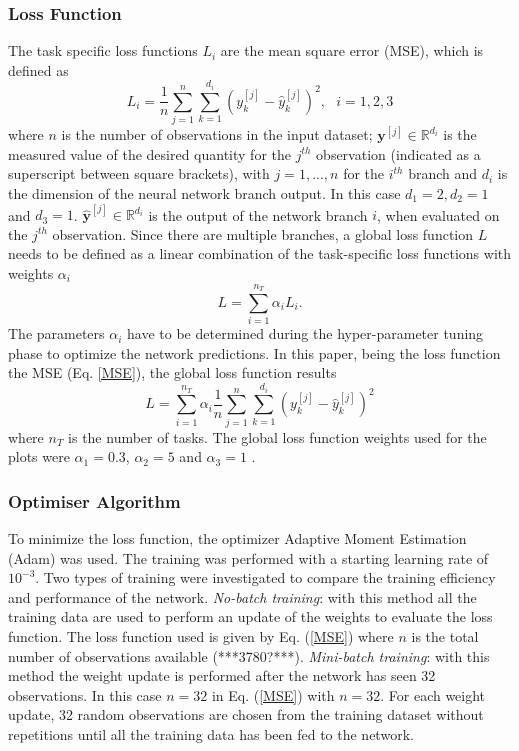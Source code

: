 \documentclass[9pt,twocolumn,twoside,pdftex]{optica}
\begin{document}
\subsubsection{Loss Function}

The task specific loss functions $L_i$ are the mean square error (MSE), which is defined as
\begin{equation}
L_i = \frac{1}{n} \sum_{j=1}^n \sum_{k=1}^{d_i} (y_k^{[j]}-\hat y_k^{[j]})^2, \ \ \ i=1,2,3
\label{MSE}
\end{equation}
where $n$ is the number of observations in the input dataset; ${\mathbold y}^{[j]} \in \mathbb{R}^{d_i}$ is the measured value of the desired quantity for the $j^{th}$ observation (indicated as a superscript between square brackets), with $j=1, ..., n$ for the $i^{th}$ branch and $d_i$ is the dimension of the neural network branch output. In this case $d_1=2, d_2=1$ and $d_3=1$. $ \hat {\mathbold y}^{[j]} \in \mathbb{R}^{d_i}$ is the output of the network branch $i$, when evaluated on the $j^{th}$ observation. Since there are multiple branches, a global loss function $L$ needs to be defined as a linear combination of the task-specific loss functions with weights $\alpha_i$ 
\begin{equation}
L = \sum_{i=1}^{n_T}\alpha_i L_i .
\label{globalcf}
\end{equation}
The parameters $\alpha_i$ have to be determined during the hyper-parameter tuning phase to optimize the network predictions.
In this paper, being the loss function the MSE (Eq. \ref{MSE}), the global loss function results
\begin{equation}
L = \sum_{i=1}^{n_T}\alpha_i \frac{1}{n} \sum_{j=1}^n \sum_{k=1}^{d_i} (y_k^{[j]}-\hat y_k^{[j]})^2
\end{equation}
where  $n_T$ is the number of tasks. The global loss function weights used for the plots were $\alpha_1 = 0.3$, $\alpha_2 = 5$ and $\alpha_3 = 1$ \cite{Michelucci2019_2}.
 

\subsubsection{Optimiser Algorithm}

To minimize the loss function, the optimizer Adaptive Moment Estimation (Adam) \cite{Kingma2014, Michelucci2017} was used. The training was performed with a starting learning rate of $10^{-3}$. Two types of training were investigated to compare the training efficiency and performance of the network. {\sl No-batch training}: with this method all the training data  are used to perform an update of the weights to evaluate the loss function. The loss function used is given by Eq. (\ref{MSE}) where $n$ is the total number of observations available (***3780?***). {\sl Mini-batch training}: with this method the weight update is performed after the network has seen 32 observations. In this case $n=32$ in Eq. (\ref{MSE}) with $n=32$. For each weight update, 32 random observations are chosen from the training dataset without repetitions until all the training data has been fed to the network.  
\end{document}
